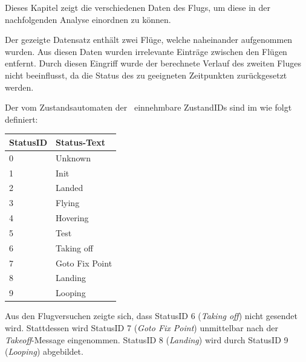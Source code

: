 
Dieses Kapitel zeigt die verschiedenen Daten des Flugs, um diese in der nachfolgenden Analyse einordnen zu können.

Der gezeigte Datensatz enthält zwei Flüge, welche naheinander aufgenommen wurden. Aus diesen Daten wurden irrelevante Einträge zwischen den Flügen entfernt. Durch diesen Eingriff wurde der berechnete Verlauf des zweiten Fluges nicht beeinflusst, da die Status des \Quad[s] zu geeigneten Zeitpunkten zurückgesetzt werden.

Der vom Zustandsautomaten der \Ar\ einnehmbare ZustandIDs sind im  wie folgt definiert:
\begin{table}[!ht]
\begin{tabular}{ll}
StatusID & Status-Text    \\ \hline
0        & Unknown        \\
1        & Init           \\
2        & Landed         \\
3        & Flying         \\
4        & Hovering       \\
5        & Test           \\
6        & Taking off     \\
7        & Goto Fix Point \\
8        & Landing        \\
9        & Looping       
\end{tabular}
\end{table}
\FloatBarrier
Aus den Flugversuchen zeigte sich, dass StatusID 6 (\textit{Taking off}) nicht gesendet wird. Stattdessen wird StatusID 7 (\textit{Goto Fix Point}) unmittelbar nach der \textit{Takeoff}-Message eingenommen. StatusID 8 (\textit{Landing}) wird durch StatusID 9 (\textit{Looping}) abgebildet. 


